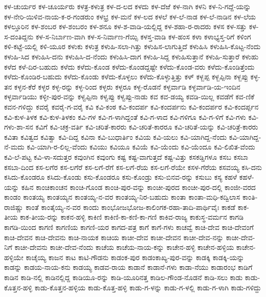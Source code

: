 ಕಳ-ಚುರ್ಯರ
ಕಳ-ಚೂರ್ಯರು
ಕಳತ್ರ-ಕಳುತ್ರ
ಕಳ-ದ-ಲದ
ಕಳದು
ಕಳ-ದೆಱೆ
ಕಳ-ನಾಗಿ
ಕಳನಿ
ಕಳ-ನಿ-ಗದ್ದೆ-ಯನ್ನು
ಕಳ-ನೇರಿ-ಯಿಳಿವ-ನಾಯ-ಕ-ರ-ಗಂಡರುಂ
ಕಳಭ್ರ
ಕಳ-ಮನೆ
ಕಳ-ಲದ
ಕಳಲೆ
ಕಳ-ಲೆ-ನಾಡ
ಕಳ-ಲೆ-ನಾಡಿನ
ಕಳ-ಲೆಯ
ಕಳಲ್ತೂರಿನ
ಕಳ-ಶಂಬರ
ಕಳ-ಶಂಬರಂ
ಕಳ-ಶನೂ
ಕಳ-ಶ-ವಾಡಿ-ಯಲ್ಲಿದ್ದ
ಕಳ-ಶಹಾ-ರ-ರಾದರು
ಕಳಸ
ಕಳ-ಸತ್ತು
ಕಳ-ಸ-ದಂತಿದ್ದನು
ಕಳ-ಸ-ನಿರ್ಬಾಣ-ವಾಗಿ
ಕಳ-ಸ-ನಿರ್ವಾಣ-ಗೆಯ್ಸಿ
ಕಳಸ್ತ-ವಾಡಿ
ಕಳ-ಹಂಸ
ಕಳಾ
ಕಳಾಭ್ಯಸ್ತ-ರಿಗೆ
ಕಳಿಂಗ
ಕಳಿ-ಕಟ್ಟೆ-ಯಲ್ಲಿ
ಕಳಿ-ಯೂರ
ಕಳುಕು
ಕಳುತ್ರ
ಕಳುಹಿ-ಸಲಾ-ಗಿತ್ತು
ಕಳುಹಿಸ-ಲಾಗುತ್ತಿದೆ
ಕಳುಹಿಸಿ
ಕಳುಹಿಸಿ-ಕೊಟ್ಟ-ನೆಂದು
ಕಳುಹಿ-ಸಿದ
ಕಳುಹಿಸಿ-ದನು
ಕಳುಹಿಸಿ-ದ-ನೆಂದು
ಕಳುಹಿಸಿ-ದಾಗ
ಕಳುಹಿ-ಸಿದ್ದ
ಕಳುಹಿಸುತ್ತಾನೆ
ಕಳುಹಿ-ಸುತ್ತಾರೆ
ಕಳುಹು
ಕಳೆದ
ಕಳೆ-ದಿರ-ಬಹುದು
ಕಳೆದು
ಕಳೆದು-ಕೊಂಡ
ಕಳೆದು-ಕೊಂಡದ್ದಷ್ಟೇ
ಕಳೆದು-ಕೊಂಡ-ವರು
ಕಳೆದು-ಕೊಂಡಿತ್ತೆಂದು
ಕಳೆದು-ಕೊಂಡಿರ-ಬಹುದು
ಕಳೆದು-ಕೊಂಡು
ಕಳೆದು-ಕೊಳ್ಳಲು
ಕಳೆದು-ಕೊಳ್ಳುತ್ತಿತ್ತು
ಕಳ್
ಕಳ್ಬಪ್ಪ
ಕಳ್ಬಪ್ಪಿನಾ
ಕಳ್ಬಪ್ಪು
ಕಳ್ಳ-ತನ
ಕಳ್ಳನ-ಕೆರೆ
ಕಳ್ಳರ
ಕಳ್ಳ-ರನ್ನು
ಕಳ್ಳ-ರಿಂದ
ಕಳ್ಳರು
ಕಳ್ಳರೂ
ಕಳ್ಳ-ರೊಡನೆ
ಕಳ್ಳರ್ವಾಡಿ
ಕಳ್ಳರ್ವಾಡಿ-ಯ-ಇಂದಿನ
ಕಳ್ಳರ್ವಾಡಿಯು
ಕಳ್ಳೀ-ಪುರ-ವನ್ನು
ಕಳ್ವಪ್ಪಿನಾ
ಕಳ್ವಪ್ಪು
ಕಳ್ವಪ್ಪು-ನಾಡು
ಕವ
ಕವ-ಡಯ್ಯ
ಕವಡಿ-ಯಿಲ್ಲ
ಕವಡೆಗೆ
ಕವ-ಣಿಕೆ
ಕವನ-ಗಳಿದ್ದು
ಕವರೈ
ಕವರೈ-ಗ-ವರೈ
ಕವಿ
ಕವಿ-ಕಂಠ
ಕವಿ-ಕಂದರ್ಪ
ಕವಿ-ಕಂದರ್ಪನು
ಕವಿ-ಕಂದರ್ಪರ
ಕವಿ-ಕಂದರ್ಪ್ಪನ
ಕವಿ-ಕುಳ-ತಿಳಕ
ಕವಿ-ಕುಳ-ತಿಳಕಂ
ಕವಿ-ಗಳ
ಕವಿ-ಗ-ಳಾಗಿದ್ದಂತೆ
ಕವಿ-ಗ-ಳಾದ
ಕವಿ-ಗಳಿಗೂ
ಕವಿ-ಗ-ಳಿಗೆ
ಕವಿ-ಗಳು
ಕವಿ-ಗಳು-ಶಾ-ಸನ
ಕವಿಗೆ
ಕವಿ-ಚಕ್ರ-ವರ್ತಿ
ಕವಿ-ಚರಿತೆ-ಕಾರರು
ಕವಿ-ಚರಿತೆ-ಕಾರರೂ
ಕವಿ-ಚರಿತೆ-ಯನ್ನು
ಕವಿ-ಚರಿತ್ರೆ-ಕಾರರು
ಕವಿತಾ
ಕವಿತ್ವದ
ಕವಿತ್ವಾ
ಕವಿ-ದಿದ್ದ
ಕವಿನಾ
ಕವಿ-ಬುಧಾರ್ತಿಂ
ಕವಿಯ
ಕವಿ-ಯಲು
ಕವಿ-ಯಾಗಿದ್ದ-ನೆಂದು
ಕವಿ-ಯಾಗಿದ್ದ-ನೆ-ಮದು
ಕವಿ-ಯಾಗಿ-ರ-ಲಿಲ್ಲ-ವೆಂದು
ಕವಿಯು
ಕವಿಯೂ
ಕವಿಯೆ
ಕವಿ-ಯೆಂದು
ಕವಿ-ಯೆಂದೂ
ಕವಿ-ಲಿಖಿತ-ವೆಂದು
ಕವಿ-ಲೆ-ಪಟ್ಟ
ಕವಿ-ಳಾ-ಸದುತ್ತರ
ಕವುಂಗಿನ
ಕವುಂಗು
ಕಷ್ಟ
ಕಷ್ಟ-ವಾಗುತ್ತದೆ
ಕಷ್ಟ-ವಿತ್ತು
ಕಸಕಡ್ಡಿಗಳೂ
ಕಸಬ
ಕಸಬಾ
ಕಸಬಾ-ದಿಂದ
ಕಸ-ಲಗೆರ
ಕಸ-ಲಗೆರೆ
ಕಸ-ಲಗೆ-ರೆಗೆ
ಕಸ-ಲಗೆ-ರೆಯ
ಕಸ-ಲಗೆ-ರೆಯೇ
ಕಸಳ-ಗೆರೆಯ
ಕಸವಯ್ಯ
ಕಸಿ-ದನು
ಕಸಿದು-ಕೊಂಡರೂ
ಕಸಿದು-ಕೊಂಡು
ಕಸು-ಕೊಂಡರೂ
ಕಸು-ಕೊಂಡ್ರು
ಕಸು-ಬಿನವ-ರನ್ನು
ಕಸುಬು
ಕಸ್ಯ
ಕಹಳೆ
ಕಹಳೆ-ಯನ್ನು
ಕಹಿನ
ಕಾಂಚಿಕಾಂಚನ
ಕಾಂಚಿ-ಗೊಂಡ
ಕಾಂಚಿ-ಪುರ-ವನ್ನು
ಕಾಂಚೀ-ಪುರದ
ಕಾಂಚೀ-ಪುರ-ದಲ್ಲಿ
ಕಾಂಜೀ-ವರದ
ಕಾಂಡಂ
ಕಾಂತಯ್ಯ
ಕಾಂತಯ್ಯನ
ಕಾಂತಯ್ಯ-ನ-ವರ
ಕಾಂತಯ್ಯ-ನಿರ-ಬಹುದು
ಕಾಂತಾ
ಕಾಂತಾ-ಮಧಿ-ಕದ್ವಿಲಾಸ
ಕಾಂತಿ-ರಾಜಿಷ್ಣು
ಕಾಂತೆ
ಕಾಂತೈಯ್ಯ-ನ-ವರ
ಕಾಂದು
ಕಾಂಭೋಜಭೋಜ-ಕಾಲಿಂಗಕ-ರಹಾ-ತಾದಿ-ಪಾರ್ಥಿವೈಃ
ಕಾಕಡೆ
ಕಾಕ-ತೀಯ
ಕಾಕ-ತೀಯ-ರನ್ನು
ಕಾಕನ-ಹಳ್ಳಿ
ಕಾಕಿಣಿ
ಕಾಕಿಣಿ-ಕಾ-ಕಣಿ-ಕಾ-ಗಣಿ
ಕಾಕಿವ-ರಾಜ್ಯ
ಕಾಕುಸ್ಥ-ವರ್ಮನ
ಕಾಗಡಿ
ಕಾಗಡಿ-ಯಿಂದ
ಕಾಗಣಿ
ಕಾಗಣಿಯ
ಕಾಗಣಿ-ಯರ
ಕಾಗದ-ಪತ್ರ
ಕಾಗೆ
ಕಾಗೆ-ಗಳು
ಕಾಚವ್ವೆ
ಕಾಚಿ-ದೇವ
ಕಾಚಿ-ದೇವಂಗೆ
ಕಾಚಿ-ದೇವನ
ಕಾಚಿ-ದೇವನು
ಕಾಚಿ-ನಾಯಕ
ಕಾಚಿಯ
ಕಾಚೀ-ದೇವ
ಕಾಚೀ-ದೇವನ
ಕಾಚೀ-ದೇವ-ನನ್ನು
ಕಾಚೀ-ದೇವ-ನಿಗೆ
ಕಾಚೀ-ದೇವನು
ಕಾಚೀ-ದೇವ-ನೆಂದು
ಕಾಚೆಯ
ಕಾಚೆಯ-ನಾಯ-ಕನ್ನು
ಕಾಚೇನ-ಹಳ್ಳಿ
ಕಾಚೇನ-ಹಳ್ಳಿಯ
ಕಾಚೇನ-ಹಳ್ಳಿಯೇ
ಕಾಚೈಯ್ಯ
ಕಾಜನ
ಕಾಟ
ಕಾಟಿ-ಗೌಡನು
ಕಾಡಂಕ-ಪುರ
ಕಾಡಂಕಾಖ್ಯ-ಪುರ-ವನ್ನು
ಕಾಡಕ್ಕಿ
ಕಾಡಕ್ಕಿ-ಯನ್ನು
ಕಾಡನ್ನು
ಕಾಡಯ-ನಾಯ-ಕನು
ಕಾಡಯ್ಯ
ಕಾಡವ-ರಾಯ
ಕಾಡಾನೆ
ಕಾಡಾನೆ-ಗಳು
ಕಾಡಾ-ನೆಯು
ಕಾಡಾರಂಭ
ಕಾಡಿಗೆ
ಕಾಡಿನ
ಕಾಡಿ-ನಲ್ಲಿ
ಕಾಡಿನಲ್ಲಿದ್ದ
ಕಾಡಿಯೂ-ರನ್ನು
ಕಾಡಿ-ಯೂರಿನತ್ತ
ಕಾಡಿಲ-ಗೌಂಡ-ನೊಡನೆ
ಕಾಡಿ-ಸಲು
ಕಾಡು
ಕಾಡು-ಕೊತ್ತನ-ಹಳ್ಳಿ
ಕಾಡು-ಕೊತ್ತನ-ಹಳ್ಳಿಯ
ಕಾಡು-ಕೊತ್ತ-ಹಳ್ಳಿ
ಕಾಡು-ಗ-ಳನ್ನು
ಕಾಡು-ಗ-ಳಲ್ಲಿ
ಕಾಡು-ಗ-ಳಾಗಿ
ಕಾಡು-ಗಳಿದ್ದು
